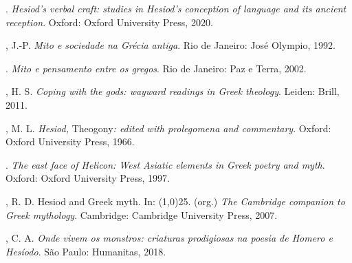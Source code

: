 \begin{bibliohedra}
\titidem. \textit{Hesiod's verbal craft: studies in Hesiod's conception of
language and its ancient reception}. Oxford: Oxford University Press,
2020.

, J.-P. \textit{Mito e sociedade na Grécia antiga}. Rio de Janeiro:
José Olympio, 1992.

\titidem. \textit{Mito e pensamento entre os gregos}. Rio de Janeiro: Paz e
Terra, 2002.

, H. S. \textit{Coping with the gods: wayward readings in Greek
theology}. Leiden: Brill, 2011.

, M. L. \textit{Hesiod,} Theogony\textit{: edited with prolegomena and
commentary}. Oxford: Oxford University Press, 1966.

\titidem. \textit{The east face of Helicon: West Asiatic elements in Greek poetry
and myth}. Oxford: Oxford University Press, 1997.

, R. D. Hesiod and Greek myth. In: \line(1,0){25}. (org.) \textit{The Cambridge
companion to Greek mythology}. Cambridge: Cambridge University Press,
2007.

, C. A. \textit{Onde vivem os monstros: criaturas prodigiosas na
poesia de Homero e Hesíodo}. São Paulo: Humanitas, 2018.
\end{bibliohedra}


\endgroup



